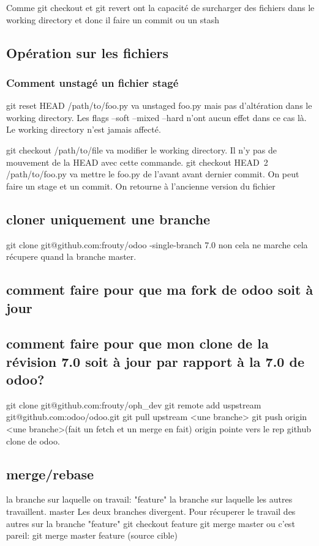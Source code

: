 \documentclass[12pt,a4paper]{article}
\begin{document}
Comme git checkout et git revert ont la capacité de surcharger des fichiers dans le working directory et donc il faire un commit ou un stash

\subsection{Opération sur les fichiers}
\subsubsection{Comment unstagé un fichier stagé}
git reset HEAD /path/to/foo.py va unstaged foo.py mais pas d'altération dans le working directory.
Les flags --soft --mixed --hard n'ont aucun effet dans ce cas là. Le working directory n'est jamais affecté.

git checkout /path/to/file va modifier le working directory. Il n'y pas de mouvement de la HEAD avec cette commande.
git checkout HEAD~2 /path/to/foo.py va mettre le foo.py de l'avant avant dernier commit. 
On peut faire un stage et un commit. On retourne à l'ancienne version du fichier 

\subsection{cloner uniquement une branche}
git clone git@github.com:frouty/odoo -single-branch 7.0
non cela ne marche cela récupere quand la branche master.
\subsection{comment faire pour que ma fork de odoo soit à jour}
\subsection{comment faire pour que mon clone de la révision 7.0 soit à jour par rapport à la 7.0 de odoo?}

git clone git@github.com:frouty/oph_dev
git remote add uspstream git@github.com:odoo/odoo.git
git pull upstream <une branche>
git push origin <une branche>(fait un fetch et un merge en fait)
origin pointe vers le rep github clone de odoo.
\subsection{merge/rebase}
la branche sur laquelle on travail: "feature"
la branche sur laquelle les autres travaillent. master
Les deux branches divergent. 
Pour récuperer le travail des autres sur la branche "feature"
git checkout feature
git merge master
ou c'est pareil: git merge master feature (source cible)
\end{document}
